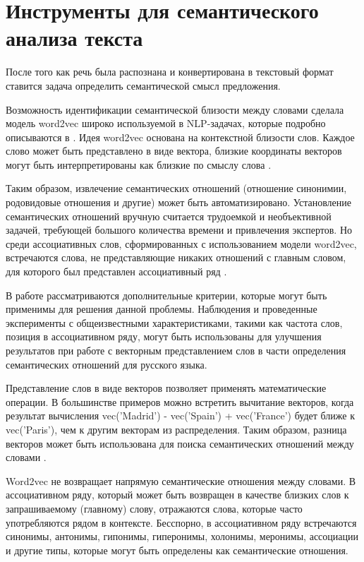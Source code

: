 \section{Инструменты для семантического анализа текста}

После того как речь была распознана и конвертирована в текстовый формат ставится задача определить
семантической смысл предложения.  

Возможность идентификации семантической близости между словами сделала модель word2vec широко используемой в NLP-задачах, которые подробно описываются в \cite{neural05}. 
Идея word2vec основана на контекстной близости слов. Каждое слово может быть представлено в виде вектора, 
близкие координаты векторов могут быть интерпретированы как близкие по смыслу слова \cite{seman04}. 

Таким образом, извлечение семантических отношений (отношение синонимии, родовидовые отношения и другие) может быть автоматизировано. 
Установление семантических отношений вручную считается трудоемкой и необъективной задачей, требующей большого количества времени и 
привлечения экспертов. Но среди ассоциативных слов, сформированных с использованием модели word2vec, встречаются слова, не 
представляющие никаких отношений с главным словом, для которого был представлен ассоциативный ряд \cite{seman03}.

В работе рассматриваются дополнительные критерии, которые могут быть применимы для решения данной проблемы. Наблюдения и проведенные 
эксперименты с общеизвестными характеристиками, такими как частота слов, позиция в ассоциативном ряду, могут быть использованы для 
улучшения результатов при работе с векторным представлением слов в части определения семантических отношений для русского языка. 

Представление слов в виде векторов позволяет применять математические операции. В большинстве примеров можно встретить вычитание векторов, 
когда результат вычисления vec('Madrid') - vec('Spain') + vec('France') будет ближе к vec('Paris'), чем к другим векторам из распределения. 
Таким образом, разница векторов может быть использована для поиска семантических отношений между словами \cite{seman02}.

Word2vec не возвращает напрямую семантические отношения между словами. В ассоциативном ряду, который может быть возвращен 
в качестве близких слов к запрашиваемому (главному) слову, отражаются слова, которые часто употребляются рядом в контексте. 
Бесспорно, в ассоциативном ряду встречаются синонимы, антонимы, гипонимы, гиперонимы, холонимы, меронимы, ассоциации и другие 
типы, которые могут быть определены как семантические отношения.


